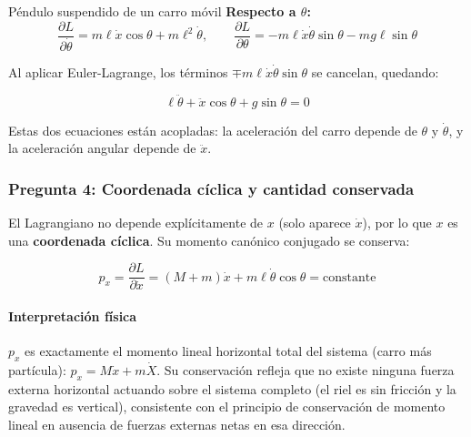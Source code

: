 \begin{solucion}{Péndulo suspendido de un carro móvil}
\textbf{Respecto a $\theta$:}
$$\frac{\partial L}{\partial\dot\theta} = m\ell\dot{x}\cos\theta + m\ell^2\dot\theta, \qquad \frac{\partial L}{\partial\theta} = -m\ell\dot{x}\dot\theta\sin\theta - mg\ell\sin\theta$$

Al aplicar Euler-Lagrange, los términos $\mp m\ell\dot{x}\dot\theta\sin\theta$ se cancelan, quedando:

$$\boxed{\ell\ddot\theta + \ddot{x}\cos\theta + g\sin\theta = 0}$$

Estas dos ecuaciones están acopladas: la aceleración del carro depende de $\theta$ y $\dot\theta$, y la aceleración angular depende de $\ddot{x}$.

\subsubsection*{Pregunta 4: Coordenada cíclica y cantidad conservada}

El Lagrangiano no depende explícitamente de $x$ (solo aparece $\dot{x}$), por lo que $x$ es una \textbf{coordenada cíclica}. Su momento canónico conjugado se conserva:

$$p_x = \frac{\partial L}{\partial\dot{x}} = (M+m)\dot{x} + m\ell\dot\theta\cos\theta = \text{constante}$$

\paragraph{Interpretación física} $p_x$ es exactamente el momento lineal horizontal total del sistema (carro más partícula): $p_x = M\dot x + m\dot X$. Su conservación refleja que no existe ninguna fuerza externa horizontal actuando sobre el sistema completo (el riel es sin fricción y la gravedad es vertical), consistente con el principio de conservación de momento lineal en ausencia de fuerzas externas netas en esa dirección.
\end{solucion}
